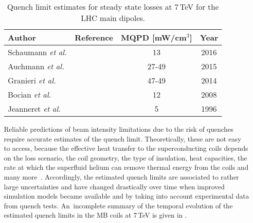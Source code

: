 \begin{table}[b]
  \centering
  \caption{Quench limit estimates for steady state losses at 7\,TeV for the LHC main dipoles.}
  \label{tab:quenchlim}
  \begin{tabular}{lccc} 
    \toprule
    Author           & Reference & MQPD {[}mW/cm$^{3}${]} & Year \\ \midrule
    Schaumann \textit{et al.} & \cite{accnote_bfpp_quench}  & 13               & 2016 \\
    Auchmann \textit{et al.} & \cite{PhysRevSTAB.18.061002}  & 27-49                  & 2015 \\
    Granieri \textit{et al.} & \cite{IEEE:granieri}          & 47-49                  & 2014 \\
    Bocian \textit{et al.} & \cite{IEEE:bocian}              & 12                     & 2008 \\
    Jeanneret \textit{et al.} & \cite{lhcprojreport44}       & 5                      & 1996 \\ \bottomrule
  \end{tabular}
\end{table}

Reliable predictions of beam intensity limitations due to the risk of quenches require accurate estimates of the quench limit. Theoretically, these are not easy to access, because the effective heat transfer to the superconducting coils depends on the loss scenario, the coil geometry, the type of insulation, heat capacities, the rate at which the superfluid helium can remove thermal energy from the coils and many more~\cite{ipac13:THPEA045}. Accordingly, the estimated quench limits are associated to rather large uncertainties and have changed drastically over time when improved simulation models became available and by taking into account experimental data from quench tests. \mbox{An incomplete} summary of the temporal evolution of the estimated quench limits in the MB coils at $7\,$TeV is given in .



\newpage
